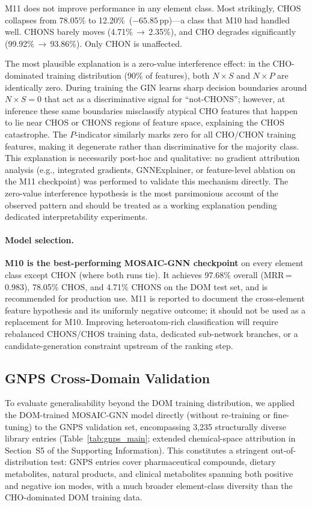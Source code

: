 \documentclass[journal=jcisd8]{achemso}
\begin{document}
M11 does not improve performance in any element class.  Most strikingly, CHOS collapses from 78.05\% to
12.20\%~($-65.85$\,pp)---a class that M10 had handled well.
CHONS barely moves (4.71\%\,$\to$\,2.35\%), and CHO degrades significantly
(99.92\%\,$\to$\,93.86\%).  Only CHON is unaffected.

The most plausible explanation is a zero-value interference effect: in the CHO-dominated
training distribution (90\% of features), both $N{\times}S$ and $N{\times}P$ are
identically zero.  During training the GIN learns sharp decision boundaries around
$N{\times}S = 0$ that act as a discriminative signal for ``not-CHONS''; however,
at inference these same boundaries misclassify atypical CHO features that happen to
lie near CHOS or CHONS regions of feature space, explaining the CHOS catastrophe.
The $P$-indicator similarly marks zero for all CHO/CHON training features, making
it degenerate rather than discriminative for the majority class.
This explanation is necessarily post-hoc and qualitative: no gradient attribution
analysis (e.g., integrated gradients, GNNExplainer, or feature-level ablation on
the M11 checkpoint) was performed to validate this mechanism directly.
The zero-value interference hypothesis is the most parsimonious account of the
observed pattern and should be treated as a working explanation pending dedicated
interpretability experiments.

\paragraph{Model selection.}
\textbf{M10 is the best-performing MOSAIC-GNN checkpoint} on every element class
except CHON (where both runs tie).
It achieves 97.68\% overall (MRR\,=\,0.983), 78.05\% CHOS, and 4.71\% CHONS
on the DOM test set, and is recommended for production use.
M11 is reported to document the cross-element feature hypothesis and its
uniformly negative outcome; it should not be used as a replacement for M10.
Improving heteroatom-rich classification will require rebalanced CHONS/CHOS training
data, dedicated sub-network branches, or a candidate-generation constraint upstream
of the ranking step.

\FloatBarrier
\subsection{GNPS Cross-Domain Validation}
\label{sec:gnps}

To evaluate generalisability beyond the DOM training distribution, we applied the DOM-trained
MOSAIC-GNN model directly (without re-training or fine-tuning) to the GNPS validation set,
encompassing 3,235 structurally diverse library entries (Table~\ref{tab:gnps_main};
extended chemical-space attribution in Section~S5 of the Supporting Information).  This
constitutes a stringent out-of-distribution test: GNPS entries cover pharmaceutical compounds,
dietary metabolites, natural products, and clinical metabolites spanning both positive and
negative ion modes, with a much broader element-class diversity than the CHO-dominated DOM
training data.
\end{document}
